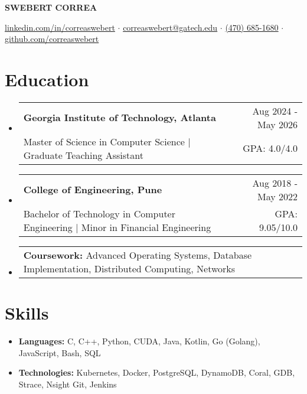 \documentclass[letterpaper,11pt]{article}
\makeatletter
\newcommand{\resumeSubheadingTwoLiner}[4]{
    \vspace{-1pt}
    \item
        \begin{tabular*}{0.99\textwidth}{l@{\extracolsep{\fill}}r}
            \textbf{#1} & #2 \\
                    #3  & #4
        \end{tabular*}
    \vspace{-5pt}
}
\newcommand{\resumeSubheadingHeadingOneLiner}[2]{
    \item
    \begin{tabular*}{0.99\textwidth}{l@{\extracolsep{\fill}}r}
        #1 & #2
    \end{tabular*}
    \vspace{-5pt}
}
\newcommand{\resumeItem}[1]{
  \item{#1}
}
\newcommand{\resumeSubHeadingListStart}{\begin{itemize}[leftmargin=2pt, label={}]}
\newcommand{\resumeSubHeadingListEnd}{\end{itemize}}
\newcommand{\resumeItemListStartNoBullet}{\begin{itemize}[leftmargin=0pt, label={}]}
\newcommand{\resumeItemListEnd}{\end{itemize}\vspace{-15pt}}
\makeatother
\begin{document}
\begin{center}

{\LARGE \uppercase{\textbf{Swebert Correa}}}

\vspace{3pt}

\href{https://www.linkedin.com/in/correaswebert}{linkedin.com/in/correaswebert}
$\cdot$
\href{mailto:correaswebert@gatech.edu}{correaswebert@gatech.edu}
$\cdot$
\href{tel:+14706851680}{(470) 685-1680}
$\cdot$
\href{https://github.com/correaswebert}{github.com/correaswebert}

\end{center}

\vspace{-10pt}


\section{Education}
\resumeSubHeadingListStart

    \resumeSubheadingTwoLiner
    {Georgia Institute of Technology, Atlanta}
    {Aug 2024 - May 2026}
    {Master of Science in Computer Science $\mid$
     Graduate Teaching Assistant}
    {GPA: 4.0/4.0}


    \resumeSubheadingTwoLiner
    {College of Engineering, Pune}
    {Aug 2018 - May 2022}
    {Bachelor of Technology in Computer Engineering $\mid$
     Minor in Financial Engineering} 
    {GPA: 9.05/10.0}

    \resumeSubheadingHeadingOneLiner
    {\textbf{Coursework:}
     Advanced Operating Systems, Database Implementation, Distributed Computing, Networks}
    {}

\resumeSubHeadingListEnd


\section{Skills}
\resumeItemListStartNoBullet
    \resumeItem
    {\textbf{Languages:}
     C, C++, Python, CUDA, Java, Kotlin, Go (Golang), JavaScript, Bash, SQL}

    \vspace{-5pt}
    
    \resumeItem
    {\textbf{Technologies:}
     Kubernetes, Docker, PostgreSQL, DynamoDB, Coral, GDB, Strace, Nsight Git, Jenkins}
\resumeItemListEnd
\end{document}

